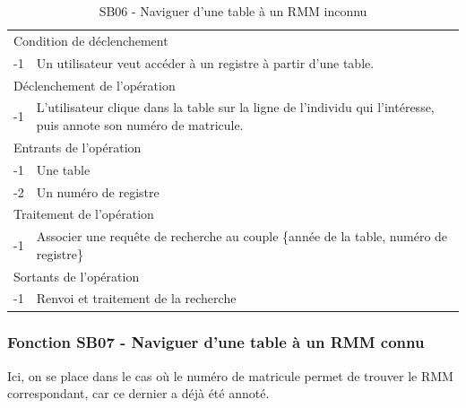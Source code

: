 \documentclass[a4paper]{article}
\begin{document}
\begin{table}[H]
  \centering
   \small
	\begin{tabular}{|c|p{12cm}|}
   		\hline
   			\rowcolor{lightgray}\multicolumn{2}{|c|}{\textbf{SB06 - Naviguer d'une table à un RMM inconnu}} \\
   		\hline
   			\multicolumn{2}{|l|}{Condition de d\'eclenchement} \\
   		\hline
   			-1 & Un utilisateur veut acc\'eder \`a un registre à partir d'une table. \\
   		\hline
   			\multicolumn{2}{|l|}{D\'eclenchement de l'op\'eration} \\
   		\hline
   			-1 & L'utilisateur clique dans la table sur la ligne de l'individu qui l'intéresse, puis annote son numéro de matricule. \\
   		\hline
   			\multicolumn{2}{|l|}{Entrants de l'op\'eration} \\
   		\hline
   			-1 & Une table \\
        			-2 & Un numéro de registre \\ 
   		\hline
   			\multicolumn{2}{|l|}{Traitement de l'op\'eration} \\
  		\hline
   			-1 & Associer une requête de recherche au couple \{année de la table, numéro de registre\} \\
   		\hline
   			\multicolumn{2}{|l|}{Sortants de l'op\'eration} \\
   		\hline
   			-1 & Renvoi et traitement de la recherche \\
   		\hline
	\end{tabular}
  \caption{SB06 - Naviguer d'une table à un RMM inconnu}
  \normalsize
  \label{tab:naviguer_table_registre_inconnu}
\end{table}
\newpage


\subsubsection{Fonction SB07 - Naviguer d'une table à un RMM connu}

Ici, on se place dans le cas où le numéro de matricule permet de trouver le RMM correspondant, car ce dernier a déjà été annoté.
\end{document}

